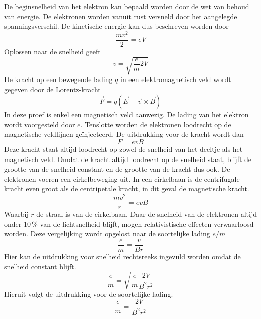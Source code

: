 De beginsnelheid van het elektron kan bepaald worden door de wet van behoud van 
energie.  De elektronen worden vanuit rust versneld door het aangelegde 
spanningsverschil.  De kinetische energie kan dus beschreven worden door
$$
\frac{mv^2}{2} = eV
$$
Oplossen naar de snelheid geeft
$$
v = \sqrt{ \frac{e}{m} 2V }
$$
De kracht op een bewegende lading $q$ in een elektromagnetisch veld wordt 
gegeven door de Lorentz-kracht
$$
\vec{F} = q(\vec{E} + \vec{v} \times \vec{B})
$$
In deze proef is enkel een magnetisch veld aanwezig. De lading van het elektron 
wordt voorgesteld door $e$. Tenslotte worden de elektronen loodrecht op de 
magnetische veldlijnen ge\"injecteerd. De uitdrukking voor de kracht wordt dan
$$
F = e v B
$$
Deze kracht staat altijd loodrecht op zowel de snelheid van het deeltje als het 
magnetisch veld. Omdat de kracht altijd loodrecht op de snelheid staat, blijft 
de grootte van de snelheid constant en de grootte van de kracht dus ook. De 
elektronen voeren een cirkelbeweging uit. In een cirkelbaan is de centrifugale 
kracht even groot als de centripetale kracht, in dit geval de magnetische 
kracht.
$$
\frac{mv^2}{r} = evB
$$
Waarbij $r$ de straal is van de cirkelbaan.
Daar de snelheid van de elektronen altijd onder 10\,\% van de lichtsnelheid 
blijft, mogen relativistische effecten verwaarloosd worden. Deze vergelijking 
wordt opgelost naar de soortelijke lading $e/m$
$$
\frac{e}{m} = \frac{v}{Br}
$$
Hier kan de uitdrukking voor snelheid rechtsreeks ingevuld worden omdat de 
snelheid constant blijft.
$$
\frac{e}{m} = \sqrt{\frac{e}{m} \frac{2V}{B^2r^2}}
$$
Hieruit volgt de uitdrukking voor de soortelijke lading.
$$
\frac{e}{m} = \frac{2V}{B^2r^2}
$$

